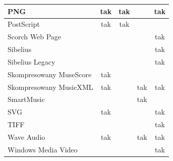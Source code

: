 \documentclass[polish,thesis,12pt]{dcsbook}
\begin{document}
\begin{center}
\begin{longtable}{|l|c|c|c|c|}
PNG                                           & tak       & tak      &        & tak      \\ \hline
PostScript                                    & tak       & tak      &        &          \\ \hline
Scorch Web Page                               &           &          &        & tak      \\ \hline
Sibelius                                      &           &          &        & tak      \\ \hline
Sibelius Legacy                               &           &          &        & tak      \\ \hline
Skompresowany MuseScore                       & tak       &          &        &          \\ \hline
Skompresowany MusicXML                        & tak       &          & tak    & tak      \\ \hline
SmartMusic                                    &           &          & tak    &          \\ \hline
SVG                                           & tak       &          &        & tak      \\ \hline
TIFF                                          &           &          &        & tak      \\ \hline
Wave Audio                                    & tak       &          & tak    & tak      \\ \hline
Windows Media Video                           &           &          &        & tak      \\ \hline
\end{longtable}
\end{center}
\end{document}

